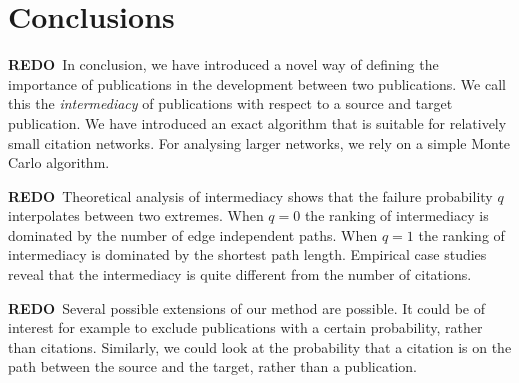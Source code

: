 \documentclass{article}
\theoremstyle{definition}
\newcommand{\redo}[1]{{\bf\color{orange}REDO}~{\color{blue}#1}}
\begin{document}
\section{\label{sec:conclusions}Conclusions}

\redo{In conclusion, we have introduced a novel way of defining the importance of publications in the development between two publications.
We call this the \emph{intermediacy} of publications with respect to a source and target publication.
We have introduced an exact algorithm that is suitable for relatively small citation networks.
For analysing larger networks, we rely on a simple Monte Carlo algorithm.}

\redo{Theoretical analysis of intermediacy shows that the failure probability $q$ interpolates between two extremes.
When $q=0$ the ranking of intermediacy is dominated by the number of edge independent paths.
When $q=1$ the ranking of intermediacy is dominated by the shortest path length.
Empirical case studies reveal that the intermediacy is quite different from the number of citations.}

\redo{Several possible extensions of our method are possible.
It could be of interest for example to exclude publications with a certain probability, rather than citations.
Similarly, we could look at the probability that a citation is on the path between the source and the target, rather than a publication.}

%
%



\end{document}
